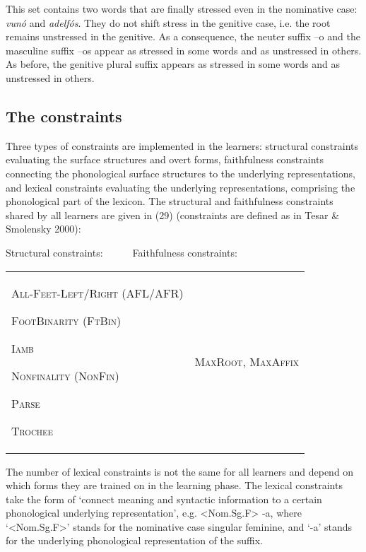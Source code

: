 \documentclass[a4paper]{article}
\begin{document}
This set contains two words that are finally stressed even in the nominative case: \textit{vunó }and \textit{adelfós}. They do not shift stress in the genitive case, i.e. the root remains unstressed in the genitive. As a consequence, the neuter suffix –o and the masculine suffix –os appear as stressed in some words and as unstressed in others. As before, the genitive plural suffix appears as stressed in some words and as unstressed in others.


\subsection{
The constraints }


Three types of constraints are implemented in the learners: structural constraints evaluating the surface structures and overt forms, faithfulness constraints connecting the phonological surface structures to the underlying representations, and lexical constraints evaluating the underlying representations, comprising the phonological part of the lexicon. The structural and faithfulness constraints shared by all learners are given in (29) (constraints are defined as in Tesar \& Smolensky 2000):


\ea Structural constraints:\ \ \ \ \ \ Faithfulness constraints:

\begin{flushleft}
\tablehead{}
\begin{supertabular}{m{2.6712599in}m{2.26296in}}
{\scshape All-Feet-Left/Right (AFL/AFR)}

{\scshape FootBinarity (FtBin)}

{\scshape Iamb}

{\scshape Nonfinality (NonFin)}

{\scshape Parse}

\scshape Trochee &
{\scshape MaxRoot, MaxAffix}

\\
\end{supertabular}
\end{flushleft}
\z

The number of lexical constraints is not the same for all learners and depend on which forms they are trained on in the learning phase. The lexical constraints take the form of ‘connect meaning and syntactic information to a certain phonological underlying representation’, e.g. {\textless}Nom.Sg.F{\textgreater} {\textbar}-a{\textbar}, where ‘{\textless}Nom.Sg.F{\textgreater}’ stands for the nominative case singular feminine, and ‘{\textbar}-a{\textbar}’ stands for the underlying phonological representation of the suffix.
\end{document}
